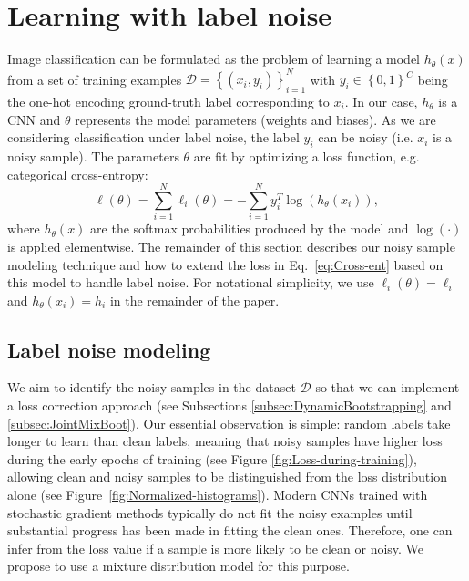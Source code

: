 \documentclass{article}
\begin{document}
\section{Learning with label noise}

Image classification can be formulated as the problem of learning a model $h_{\theta}(x)$ from a set of training examples $\mathcal{D}=\left\{ \left(x_{i},y_{i}\right)\right\} _{i=1}^{N}$ with $y_{i}\in\left\{ 0,1\right\} ^{C}$ being the one-hot encoding ground-truth label corresponding to $x_{i}$.
In our case, $h_{\theta}$ is a CNN and $\theta$ represents the model parameters (weights and biases).
As we are considering classification under label noise, the label $y_{i}$ can be noisy (i.e. $x_{i}$ is a noisy sample).
The parameters $\theta$ are fit by optimizing a loss function, e.g. categorical cross-entropy:
\begin{equation}
\ell(\theta)=\sum_{i=1}^{N} \ell_i(\theta) = -\sum_{i=1}^{N} y_{i}^T\log\left(h_{\theta}(x_{i})\right),\label{eq:Cross-ent}
\end{equation}
where $h_{\theta}(x)$ are the softmax probabilities produced by the model and $\log(\cdot)$ is applied elementwise. 
The remainder of this section describes our noisy sample modeling technique and how to extend the loss in Eq.~\eqref{eq:Cross-ent} based on this model to handle label noise. 
For notational simplicity, we use $\ell_i(\theta)=\ell_i$ and $h_{\theta}(x_i)=h_i$ in the remainder of the paper.

\subsection{Label noise modeling\label{subsec:Label-noise-modeling}}

We aim to identify the noisy samples in the dataset $\mathcal{D}$
so that we can implement a loss correction approach (see Subsections
\ref{subsec:DynamicBootstrapping} and \ref{subsec:JointMixBoot}).
Our essential observation is simple: random labels take longer to learn than
clean labels, meaning that noisy samples have higher loss during the early epochs
of training (see Figure \ref{fig:Loss-during-training}), allowing clean and noisy samples to be distinguished from the loss distribution alone (see Figure~\ref{fig:Normalized-histograms}). Modern CNNs trained 
with stochastic gradient methods typically do not fit the noisy examples until 
substantial progress has been made in fitting the clean ones. Therefore, one
can infer from the loss value if a sample is more likely to be clean or
noisy. We propose to use a mixture distribution model for this purpose. 
\end{document}
